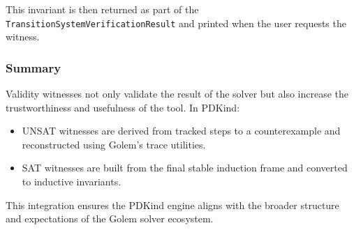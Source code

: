 This invariant is then returned as part of the
\texttt{TransitionSystemVerificationResult} and printed when the user requests
the witness.

\subsubsection*{Summary}

\noindent Validity witnesses not only validate the result of the solver but also increase the trustworthiness and usefulness of the tool. In PDKind:
\begin{itemize}
    \item UNSAT witnesses are derived from tracked steps to a counterexample and reconstructed using Golem's trace utilities.
    \item SAT witnesses are built from the final stable induction frame and converted to inductive invariants.
\end{itemize}

This integration ensures the PDKind engine aligns with the broader structure and expectations of the Golem solver ecosystem.
